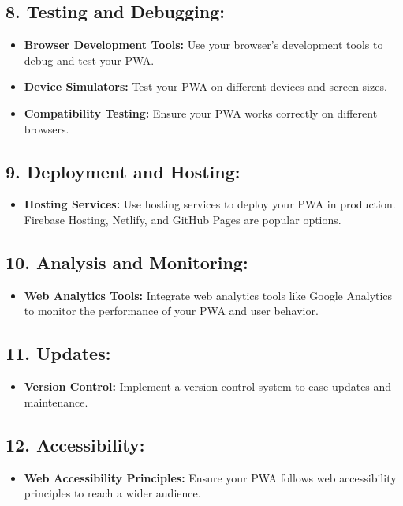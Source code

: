 \documentclass{article}
\begin{document}
\subsection*{8. Testing and Debugging:}
\begin{itemize}
  \item \textbf{Browser Development Tools:} Use your browser's development tools to debug and test your PWA.
  \item \textbf{Device Simulators:} Test your PWA on different devices and screen sizes.
  \item \textbf{Compatibility Testing:} Ensure your PWA works correctly on different browsers.
\end{itemize}

\subsection*{9. Deployment and Hosting:}
\begin{itemize}
  \item \textbf{Hosting Services:} Use hosting services to deploy your PWA in production. Firebase Hosting, Netlify, and GitHub Pages are popular options.
\end{itemize}

\subsection*{10. Analysis and Monitoring:}
\begin{itemize}
  \item \textbf{Web Analytics Tools:} Integrate web analytics tools like Google Analytics to monitor the performance of your PWA and user behavior.
\end{itemize}

\subsection*{11. Updates:}
\begin{itemize}
  \item \textbf{Version Control:} Implement a version control system to ease updates and maintenance.
\end{itemize}

\subsection*{12. Accessibility:}
\begin{itemize}
  \item \textbf{Web Accessibility Principles:} Ensure your PWA follows web accessibility principles to reach a wider audience.
\end{itemize}
\end{document}
